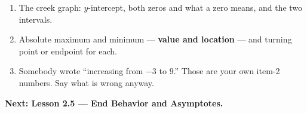 \documentclass[aspectratio=169, 11pt]{beamer}
\begin{document}
\begin{frame}[t, plain]
  \begin{enumerate}
    \setlength{\itemsep}{0.3cm}
    \item The creek graph: $y$-intercept, both zeros and what a zero means, and the two intervals.
    \item Absolute maximum and minimum --- \textbf{value and location} --- and turning point or
          endpoint for each.
    \item Somebody wrote ``increasing from $-3$ to $9$.'' Those are your own item-2 numbers. Say what
          is wrong anyway.
  \end{enumerate}
  \vspace{0.25cm}
  {\color{royal}\bfseries Next: Lesson 2.5 --- End Behavior and Asymptotes.}
\end{frame}
\end{document}
